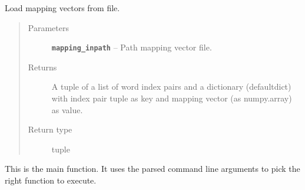 \documentclass[letterpaper,10pt,english]{sphinxmanual}
\begin{document}

\begin{fulllineitems}
\label{src.clustering:src.clustering.cluster_mappings.load_mappings_from_model}
Load mapping vectors from file.
\begin{quote}\begin{description}
\item[{Parameters}] \leavevmode
\textbf{\texttt{mapping\_inpath}} -- Path mapping vector file.

\item[{Returns}] \leavevmode
A tuple of a list of word index pairs and a dictionary (defaultdict) with index pair tuple as key
and mapping vector (as numpy.array) as value.

\item[{Return type}] \leavevmode
tuple

\end{description}\end{quote}

\end{fulllineitems}


\begin{fulllineitems}
\label{src.clustering:src.clustering.cluster_mappings.main}
This is the main function. It uses the parsed command line arguments to pick the right function to execute.

\end{fulllineitems}

\end{document}
